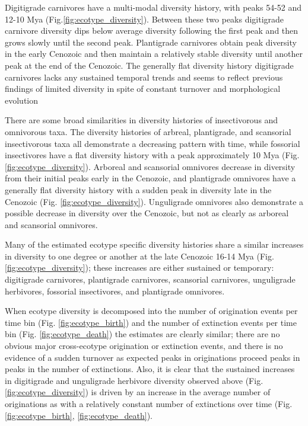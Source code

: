 \documentclass[12pt,letterpaper]{article}
\begin{document}
Digitigrade carnivores have a multi-modal diversity history, with peaks 54-52 and 12-10 Mya (Fig.\ref{fig:ecotype_diversity}). Between these two peaks digitigrade carnivore diversity dips below average diversity following the first peak and then grows slowly until the second peak. Plantigrade carnivores obtain peak diversity in the early Cenozoic and then maintain a relatively stable diversity until another peak at the end of the Cenozoic. The generally flat diversity history digitigrade carnivores lacks any sustained temporal trends and seems to reflect previous findings of limited diversity in spite of constant turnover and morphological evolution \citep{Valkenburgh1999,Silvestro2015b,Slater2015c}

There are some broad similarities in diversity histories of insectivorous and omnivorous taxa. The diversity histories of arbreal, plantigrade, and scansorial insectivorous taxa all demonstrate a decreasing pattern with time, while fossorial insectivores have a flat diversity history with a peak approximately 10 Mya (Fig. \ref{fig:ecotype_diversity}). Arboreal and scansorial omnivores decrease in diversity from their initial peaks early in the Cenozoic, and plantigrade omnivores have a generally flat diversity history with a sudden peak in diversity late in the Cenozoic (Fig. \ref{fig:ecotype_diversity}). Unguligrade omnivores also demonstrate a possible decrease in diversity over the Cenozoic, but not as clearly as arboreal and scansorial omnivores.

Many of the estimated ecotype specific diversity histories share a similar increases in diversity to one degree or another at the late Cenozoic 16-14 Mya (Fig. \ref{fig:ecotype_diversity}); these increases are either sustained or temporary: digitigrade carnivores, plantigrade carnivores, scansorial carnivores, unguligrade herbivores, fossorial insectivores, and plantigrade omnivores.

When ecotype diversity is decomposed into the number of origination events per time bin (Fig. \ref{fig:ecotype_birth}) and the number of extinction events per time bin (Fig. \ref{fig:ecotype_death}) the estimates are clearly similar; there are no obvious major cross-ecotype origination or extinction events, and there is no evidence of a sudden turnover as expected peaks in originations proceed peaks in peaks in the number of extinctions. Also, it is clear that the sustained increases in digitigrade and unguligrade herbivore diversity observed above (Fig. \ref{fig:ecotype_diversity}) is driven by an increase in the average number of originations as with a relatively constant number of extinctions over time (Fig. \ref{fig:ecotype_birth}, \ref{fig:ecotype_death}).
\end{document}
